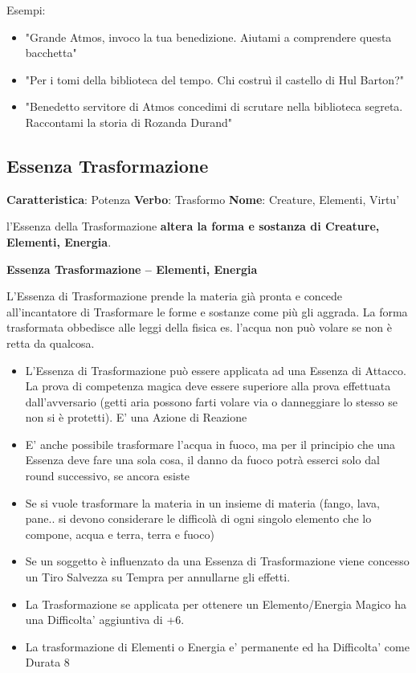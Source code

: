 \documentclass[a4paper,11pt,twoside,openany]{book}
\begin{document}
\bigskip

Esempi:
\begin{itemize}
	\item
	      "Grande Atmos, invoco la tua benedizione. Aiutami a comprendere questa bacchetta"
	\item
	      "Per i tomi della biblioteca del tempo. Chi costruì il castello di Hul Barton?"
	\item
	      "Benedetto servitore di Atmos concedimi di scrutare nella biblioteca segreta. Raccontami la storia di Rozanda Durand"
\end{itemize}
\pagebreak


\subsection{Essenza Trasformazione}

\textbf{Caratteristica}: Potenza
\textbf{Verbo}: Trasformo
\textbf{Nome}: Creature, Elementi, Virtu'

\label{essenza-trasformazione---potenza}

l'Essenza della Trasformazione \textbf{altera la forma e sostanza di Creature, Elementi, Energia}.

\bigskip

\textbf{Essenza Trasformazione -- Elementi, Energia}

L'Essenza di Trasformazione prende la materia già pronta e concede all'incantatore di Trasformare le forme e sostanze come più gli aggrada. La forma trasformata obbedisce alle leggi della fisica es. l'acqua non può volare se non è retta da qualcosa.

\begin{itemize}
	\item
	      L'Essenza di Trasformazione può essere applicata ad una Essenza di Attacco. La prova di competenza magica deve essere superiore alla prova effettuata dall'avversario (getti aria possono farti volare via o danneggiare lo stesso se non si è protetti). E' una Azione di Reazione
	\item
	      E' anche possibile trasformare l'acqua in fuoco, ma per il principio che una Essenza deve fare una sola cosa, il danno da fuoco potrà esserci solo dal round successivo, se ancora esiste
	\item
	      Se si vuole trasformare la materia in un insieme di materia (fango, lava, pane.. si devono considerare le difficolà di ogni singolo elemento che lo compone, acqua e terra, terra e fuoco)
	\item
	      Se un soggetto è influenzato da una Essenza di Trasformazione viene concesso un Tiro Salvezza su Tempra per annullarne gli effetti.
	\item	
		  La Trasformazione se applicata per ottenere un Elemento/Energia Magico ha una Difficolta' aggiuntiva di +6.
	\item	
		  La trasformazione di Elementi o Energia e' permanente ed ha Difficolta' come Durata 8      
		  
\end{itemize}
\end{document}

